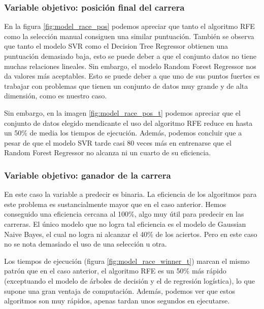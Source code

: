 \subsubsection{Variable objetivo: posición final del carrera}
En la figura \ref{fig:model_race_pos} podemos apreciar que tanto el algoritmo RFE  como la selección manual consiguen una similar puntuación. También se observa que tanto el modelo SVR como el Decision Tree Regressor obtienen una puntuación demasiado baja, esto se puede deber a que el conjunto datos no tiene muchas relaciones lineales. Sin embargo, el modelo Random Forest Regressor nos da valores más aceptables. Esto se puede deber a que uno de sus puntos fuertes es trabajar con problemas que tienen un conjunto de datos muy grande y de alta dimensión, como es nuestro caso.


Sin embargo, en la imagen \ref{fig:model_race_pos_t} podemos apreciar que el conjunto de datos elegido mendicante el uso del algoritmo RFE reduce en hasta un 50\% de media los tiempos de ejecución. Además, podemos concluir que a pesar de que el modelo SVR tarde casi 80 veces más en entrenarse que el Random Forest Regressor no alcanza ni un cuarto de su eficiencia.


\subsubsection{Variable objetivo: ganador de la carrera}
En este caso la variable a predecir es binaria. La eficiencia de los algoritmos para este problema es sustancialmente mayor que en el caso anterior. Hemos conseguido una eficiencia cercana al 100\%, algo muy útil para predecir en las carreras. El único modelo que no logra tal eficiencia es el modelo de Gaussian Naive Bayes, el cual no logra ni alcanzar el 40\% de los aciertos. Pero en este caso no se nota demasiado el uso de una selección u otra.

Los tiempos de ejecución (figura \ref{fig:model_race_winner_t}) marcan el mismo patrón que en el caso anterior, el algoritmo RFE es un 50\% más rápido (exceptuando el modelo de árboles de decisión y el de regresión logística), lo que supone una gran ventaja de computación. Además, podemos ver que estos algoritmos son muy rápidos, apenas tardan unos segundos en ejecutarse.

